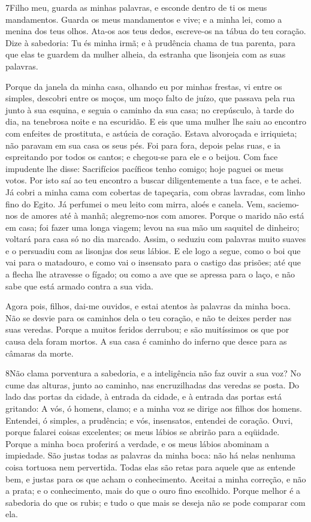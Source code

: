 \medskip

\lettrine{7}{}Filho meu, guarda as minhas palavras, e esconde
dentro de ti os meus mandamentos. Guarda os meus mandamentos e
vive; e a minha lei, como a menina dos teus olhos. Ata-os aos
teus dedos, escreve-os na tábua do teu coração. Dize à
sabedoria: Tu és minha irmã; e à prudência chama de tua parenta,
para que elas te guardem da mulher alheia, da estranha que
lisonjeia com as suas palavras.

Porque da janela da minha casa, olhando eu por minhas frestas,
vi entre os simples, descobri entre os moços, um moço falto de
juízo, que passava pela rua junto à sua esquina, e seguia o
caminho da sua casa; no crepúsculo, à tarde do dia, na tenebrosa
noite e na escuridão. E eis que uma mulher lhe saiu ao
encontro com enfeites de prostituta, e astúcia de coração.
Estava alvoroçada e irriquieta; não paravam em sua casa os
seus pés. Foi para fora, depois pelas ruas, e ia espreitando
por todos os cantos; e chegou-se para ele e o beijou. Com
face impudente lhe disse: Sacrifícios pacíficos tenho comigo;
hoje paguei os meus votos. Por isto saí ao teu encontro a
buscar diligentemente a tua face, e te achei. Já cobri a
minha cama com cobertas de tapeçaria, com obras lavradas, com linho
fino do Egito. Já perfumei o meu leito com mirra, aloés e
canela. Vem, saciemo-nos de amores até à manhã; alegremo-nos
com amores. Porque o marido não está em casa; foi fazer uma
longa viagem; levou na sua mão um saquitel de dinheiro;
voltará para casa só no dia marcado. Assim, o seduziu com
palavras muito suaves e o persuadiu com as lisonjas dos seus lábios.
E ele logo a segue, como o boi que vai para o matadouro, e
como vai o insensato para o castigo das prisões; até que a
flecha lhe atravesse o fígado; ou como a ave que se apressa para o
laço, e não sabe que está armado contra a sua vida.

Agora pois, filhos, dai-me ouvidos, e estai atentos às palavras
da minha boca. Não se desvie para os caminhos dela o teu
coração, e não te deixes perder nas suas veredas. Porque a
muitos feridos derrubou; e são muitíssimos os que por causa dela
foram mortos. A sua casa é caminho do inferno que desce para
as câmaras da morte.

\medskip

\lettrine{8}{}Não clama porventura a sabedoria, e a
inteligência não faz ouvir a sua voz? No cume das alturas, junto
ao caminho, nas encruzilhadas das veredas se posta. Do lado das
portas da cidade, à entrada da cidade, e à entrada das portas está
gritando: A vós, ó homens, clamo; e a minha voz se dirige aos
filhos dos homens. Entendei, ó simples, a prudência; e vós,
insensatos, entendei de coração. Ouvi, porque falarei coisas
excelentes; os meus lábios se abrirão para a eqüidade. Porque a
minha boca proferirá a verdade, e os meus lábios abominam a
impiedade. São justas todas as palavras da minha boca: não há
nelas nenhuma coisa tortuosa nem pervertida. Todas elas são
retas para aquele que as entende bem, e justas para os que acham o
conhecimento. Aceitai a minha correção, e não a prata; e o
conhecimento, mais do que o ouro fino escolhido. Porque
melhor é a sabedoria do que os rubis; e tudo o que mais se deseja
não se pode comparar com ela.

